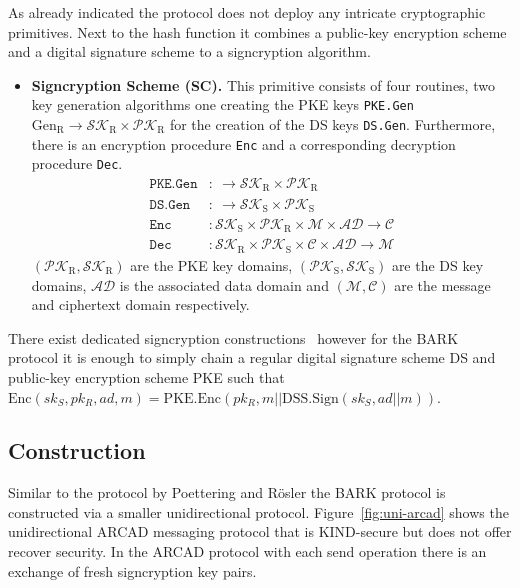 \documentclass[11pt,a4paper,twoside,openright,bibliography=totoc]{scrbook}
\renewcommand{\t}{\text} %
\begin{document}
As already indicated the protocol does not deploy any intricate
cryptographic primitives. Next to the hash function it combines a
public-key encryption scheme and a digital signature scheme to
a signcryption algorithm.
\begin{itemize}
\item \textbf{Signcryption Scheme (SC).} This primitive consists of four routines,
  two key generation algorithms one creating the PKE keys \texttt{PKE.Gen}
  $\t{Gen}_\t{R} \rightarrow \mathcal{SK}_\t{R} \times \mathcal{PK}_\t{R}$
  for the creation of the DS keys \texttt{DS.Gen}. Furthermore,
  there is an encryption procedure \texttt{Enc} and a corresponding
  decryption procedure \texttt{Dec}.
  \begin{align*}
    \texttt{PKE.Gen} & : \ \rightarrow \mathcal{SK}_\t{R} \times \mathcal{PK}_\t{R} \\
    \texttt{DS.Gen} & : \ \rightarrow \mathcal{SK}_\t{S} \times \mathcal{PK}_\t{S} \\
    \texttt{Enc} & : \mathcal{SK}_\t{S} \times \mathcal{PK}_\t{R} \times \mathcal{M} \times
                   \mathcal{AD} \rightarrow \mathcal{C} \\
    \texttt{Dec} & : \mathcal{SK}_\t{R} \times \mathcal{PK}_\t{S} \times
  \mathcal{C} \times \mathcal{AD} \rightarrow \mathcal{M}
  \end{align*}
  $(\mathcal{PK}_\t{R},\mathcal{SK}_\t{R})$ are the PKE key domains,
  $(\mathcal{PK}_\t{S},\mathcal{SK}_\t{S})$ are the DS key domains, $\mathcal{AD}$
  is the associated data domain and $(\mathcal{M}, \mathcal{C})$ are
  the message and ciphertext domain respectively.
\end{itemize}

There exist dedicated signcryption constructions~\cite{zheng1997digital}
however for the BARK protocol
it is enough to simply chain a regular digital signature scheme DS and
public-key encryption scheme PKE
such that $\t{Enc}(sk_S,pk_R,ad,m) = \t{PKE.Enc}(pk_R,m || \t{DSS.Sign}(sk_S,ad || m))$.

\subsection{Construction}
\label{sec:construction-2}

Similar to the protocol by Poettering and Rösler the BARK protocol is
constructed via a smaller unidirectional protocol. Figure~\ref{fig:uni-arcad}
shows the unidirectional ARCAD messaging protocol that is KIND-secure but
does not offer recover security. In the ARCAD protocol with each send operation
there is an exchange of fresh signcryption key pairs.
\end{document}
